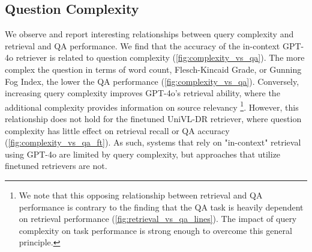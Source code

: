 \subsection{Question Complexity} 
We observe and report interesting relationships between query complexity and retrieval and QA performance. We find that the accuracy of the in-context GPT-4o retriever is related to question complexity (\autoref{fig:complexity_vs_qa}). The more complex the question in terms of word count, Flesch-Kincaid Grade, or Gunning Fog Index, the lower the QA performance (\autoref{fig:complexity_vs_qa}). Conversely, increasing query complexity improves GPT-4o's retrieval ability, where the additional complexity provides information on source relevancy \footnote{We note that this opposing relationship between retrieval and QA performance is contrary to the finding that the QA task is heavily dependent on retrieval performance (\autoref{fig:retrieval_vs_qa_lines}). The impact of query complexity on task performance is strong enough to overcome this general principle.}. However, this relationship does not hold for the finetuned UniVL-DR retriever, where question complexity has little effect on retrieval recall or QA accuracy (\autoref{fig:complexity_vs_qa_ft}). As such, systems that rely on "in-context" retrieval using GPT-4o are limited by query complexity, but approaches that utilize finetuned retrievers are not.





